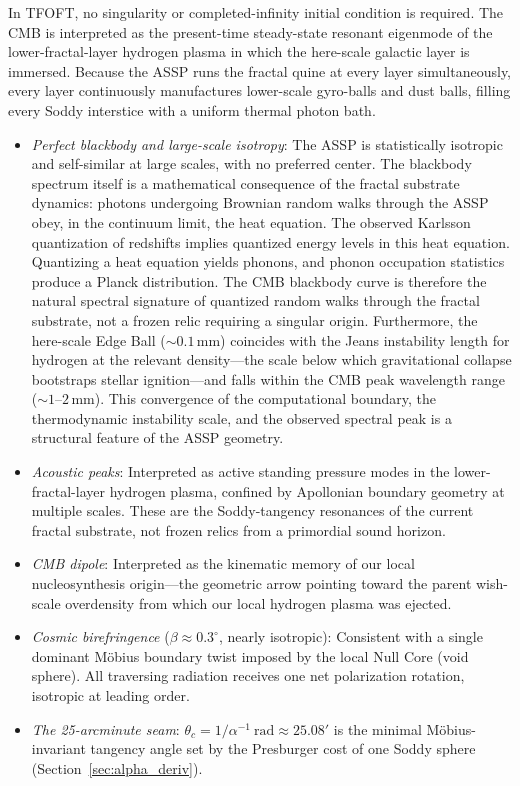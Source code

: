 \documentclass[11pt,a4paper]{article}
\begin{document}
In TFOFT, no singularity or completed-infinity initial condition is required. The CMB is interpreted as the present-time steady-state resonant eigenmode of the lower-fractal-layer hydrogen plasma in which the here-scale galactic layer is immersed. Because the ASSP runs the fractal quine at every layer simultaneously, every layer continuously manufactures lower-scale gyro-balls and dust balls, filling every Soddy interstice with a uniform thermal photon bath.

\begin{itemize}
  \item \textit{Perfect blackbody and large-scale isotropy}: The ASSP is statistically isotropic and self-similar at large scales, with no preferred center. The blackbody spectrum itself is a mathematical consequence of the fractal substrate dynamics: photons undergoing Brownian random walks through the ASSP obey, in the continuum limit, the heat equation. The observed Karlsson quantization of redshifts implies quantized energy levels in this heat equation. Quantizing a heat equation yields phonons, and phonon occupation statistics produce a Planck distribution. The CMB blackbody curve is therefore the natural spectral signature of quantized random walks through the fractal substrate, not a frozen relic requiring a singular origin. Furthermore, the here-scale Edge Ball ($\sim0.1$\,mm) coincides with the Jeans instability length for hydrogen at the relevant density---the scale below which gravitational collapse bootstraps stellar ignition---and falls within the CMB peak wavelength range ($\sim1$--$2$\,mm). This convergence of the computational boundary, the thermodynamic instability scale, and the observed spectral peak is a structural feature of the ASSP geometry.
  \item \textit{Acoustic peaks}: Interpreted as active standing pressure modes in the lower-fractal-layer hydrogen plasma, confined by Apollonian boundary geometry at multiple scales. These are the Soddy-tangency resonances of the current fractal substrate, not frozen relics from a primordial sound horizon.
  \item \textit{CMB dipole}: Interpreted as the kinematic memory of our local nucleosynthesis origin---the geometric arrow pointing toward the parent wish-scale overdensity from which our local hydrogen plasma was ejected.
  \item \textit{Cosmic birefringence} ($\beta \approx 0.3^\circ$, nearly isotropic): Consistent with a single dominant Möbius boundary twist imposed by the local Null Core (void sphere). All traversing radiation receives one net polarization rotation, isotropic at leading order.
  \item \textit{The 25-arcminute seam}: $\theta_c = 1/\alpha^{-1}\ \text{rad} \approx 25.08'$ is the minimal Möbius-invariant tangency angle set by the Presburger cost of one Soddy sphere (Section~\ref{sec:alpha_deriv}).
\end{itemize}
\end{document}
